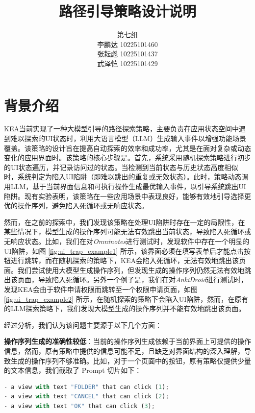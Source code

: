 \documentclass{article}
\title{\textbf{路径引导策略设计说明}}
\author{第七组 \\ 
李鹏达 10225101460 \\[-1em]
张耘彪 10225101437 \\[-1em]
武泽恺 10225101429
}
\date{}
\begin{document}
\maketitle

\section{背景介绍}

\linespread{1.5}

K{\small\MakeUppercase{ea}}当前实现了一种大模型引导的路径探索策略，主要负责在应用状态空间中遇到难以探索的UI状态时，利用大语言模型（LLM）生成输入事件以增强功能场景覆盖。该策略的设计旨在提高自动探索的效率和成功率，尤其是在面对复杂或动态变化的应用界面时。该策略的核心步骤是。首先，系统采用随机探索策略进行初步的UI状态遍历，并记录访问过的状态。当检测到当前状态与历史状态高度相似时，系统判定为陷入UI陷阱（即难以跳出的重复或无效状态）。此时，策略动态调用LLM，基于当前界面信息和可执行操作生成最优输入事件，以引导系统跳出UI陷阱。现有实验表明，该策略在一些应用场景中表现良好，能够有效地引导选择更优的操作序列，避免陷入死循环或无响应状态。

然而，在之前的探索中，我们发现该策略在处理UI陷阱时存在一定的局限性，在某些情况下，模型生成的操作序列可能无法有效跳出当前状态，导致陷入死循环或无响应状态。比如，我们在对\textit{Omninotes}进行测试时，发现软件中存在一个明显的UI陷阱，如图 \ref{fig:ui_trap_example1} 所示，该界面必须在填写表单后才能点击按钮进行跳转，而在随机探索的策略下，K{\small\MakeUppercase{ea}}会陷入死循环，无法有效地跳出该页面。我们尝试使用大模型生成操作序列，但发现生成的操作序列仍然无法有效地跳出该页面，导致陷入死循环。另外一个例子是，我们在对\textit{AnkiDroid}进行测试时，发现K{\small\MakeUppercase{ea}}会由于软件申请权限而跳转至一个权限申请页面，如图 \ref{fig:ui_trap_example2} 所示，在随机探索的策略下会陷入UI陷阱，然而，在原有的LLM探索策略下，我们发现大模型生成的操作序列并不能有效地跳出该页面。

经过分析，我们认为该问题主要源于以下几个方面：

\textbf{操作序列生成的准确性较低}：当前的操作序列生成依赖于当前界面上可提供的操作信息，然而，原有策略中提供的信息可能不足，且缺乏对界面结构的深入理解，导致生成的操作序列不够准确。比如，对于一个页面中的按钮，原有策略仅提供少量的文本信息，我们截取了 Prompt 切片如下：

\begin{lstlisting}[language=Python]
- a view with text "FOLDER" that can click (1);
- a view with text "CANCEL" that can click (2);
- a view with text "OK" that can click (3);
\end{lstlisting}
\end{document}
